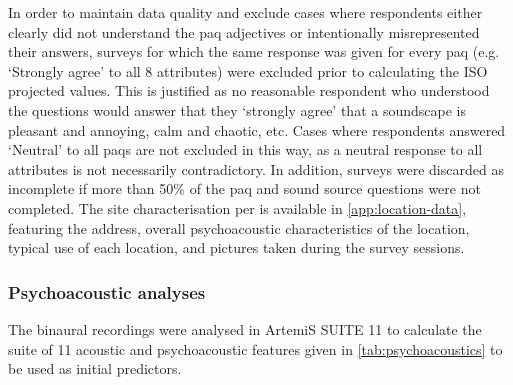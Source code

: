    In order to maintain data quality and exclude cases where respondents either clearly did not understand the \gls{paq} adjectives or intentionally misrepresented their answers, surveys for which the same response was given for every \gls{paq} (e.g. `Strongly agree' to all 8 attributes) were excluded prior to calculating the ISO projected values. This is justified as no reasonable respondent who understood the questions would answer that they `strongly agree' that a soundscape is pleasant and annoying, calm and chaotic, etc. Cases where respondents answered `Neutral' to all \glspl{paq} are not excluded in this way, as a neutral response to all attributes is not necessarily contradictory. In addition, surveys were discarded as incomplete if more than 50\% of the \gls{paq} and sound source questions were not completed. The site characterisation per \citet{ISO12913Part2} is available in \cref{app:location-data}, featuring the address, overall psychoacoustic characteristics of the location, typical use of each location, and pictures taken during the survey sessions.

   \subsubsection{Psychoacoustic analyses}
   \label{sec:analyses}
   The binaural recordings were analysed in ArtemiS SUITE 11 to calculate the suite of 11 acoustic and psychoacoustic features given in \cref{tab:psychoacoustics} to be used as initial predictors.

